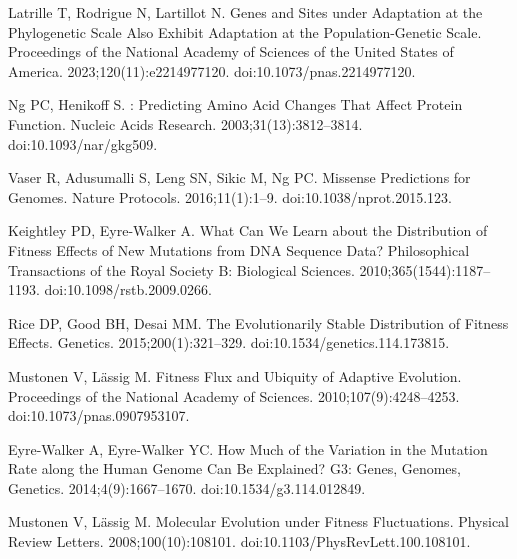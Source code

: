 \documentclass{article}
\begin{document}
\begin{thebibliography}{10}
        Latrille T, Rodrigue N, Lartillot N.
        \newblock Genes and Sites under Adaptation at the Phylogenetic Scale Also
        Exhibit Adaptation at the Population-Genetic Scale.
        \newblock Proceedings of the National Academy of Sciences of the United States
        of America. 2023;120(11):e2214977120.
        \newblock doi:{10.1073/pnas.2214977120}.

        Ng PC, Henikoff S.
        : Predicting Amino Acid Changes That Affect Protein Function.
        \newblock Nucleic Acids Research. 2003;31(13):3812--3814.
        \newblock doi:{10.1093/nar/gkg509}.

        Vaser R, Adusumalli S, Leng SN, Sikic M, Ng PC.
         Missense Predictions for Genomes.
        \newblock Nature Protocols. 2016;11(1):1--9.
        \newblock doi:{10.1038/nprot.2015.123}.

        Keightley PD, {Eyre-Walker} A.
        \newblock What Can We Learn about the Distribution of Fitness Effects of New
        Mutations from {{DNA}} Sequence Data?
        \newblock Philosophical Transactions of the Royal Society B: Biological
        Sciences. 2010;365(1544):1187--1193.
        \newblock doi:{10.1098/rstb.2009.0266}.

        Rice DP, Good BH, Desai MM.
        \newblock The {{Evolutionarily Stable Distribution}} of {{Fitness Effects}}.
        \newblock Genetics. 2015;200(1):321--329.
        \newblock doi:{10.1534/genetics.114.173815}.

        Mustonen V, L{\"a}ssig M.
        \newblock Fitness Flux and Ubiquity of Adaptive Evolution.
        \newblock Proceedings of the National Academy of Sciences.
        2010;107(9):4248--4253.
        \newblock doi:{10.1073/pnas.0907953107}.

        {Eyre-Walker} A, {Eyre-Walker} YC.
        \newblock How Much of the Variation in the Mutation Rate along the Human Genome
        Can Be Explained?
        \newblock G3: Genes, Genomes, Genetics. 2014;4(9):1667--1670.
        \newblock doi:{10.1534/g3.114.012849}.

        Mustonen V, L{\"a}ssig M.
        \newblock Molecular {{Evolution}} under {{Fitness Fluctuations}}.
        \newblock Physical Review Letters. 2008;100(10):108101.
        \newblock doi:{10.1103/PhysRevLett.100.108101}.


\end{thebibliography}
\end{document}
